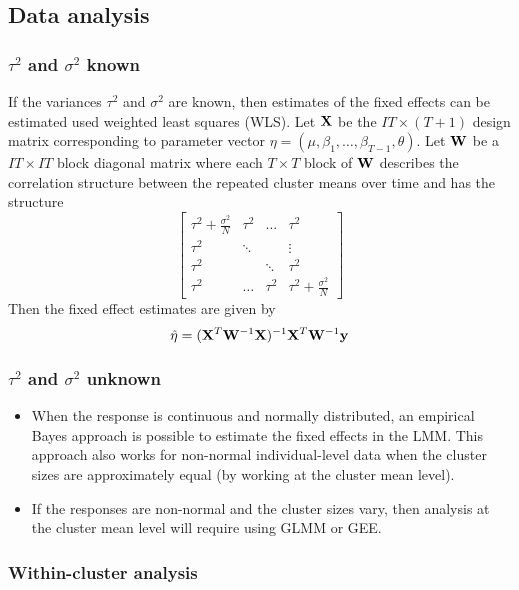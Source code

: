 \documentclass{article}
\newcommand{\bfW}{{\bf W}}
\newcommand{\bfX}{{\bf X}}
\newcommand{\bfy}{{\bf y}}
\begin{document}
\subsection{Data analysis}

\subsubsection{$\tau^2$ and $\sigma^2$ known}

If the variances $\tau^2$ and $\sigma^2$ are known, then estimates of the fixed effects can be estimated used weighted least squares (WLS). Let $\bfX$ be the $IT\times(T+1)$ design matrix corresponding to parameter vector $\eta=(\mu,\beta_1,\ldots,\beta_{T-1},\theta)$. Let $\bfW$ be a $IT\times IT$ block diagonal matrix where each $T\times T$ block of $\bfW$ describes the correlation structure between the repeated cluster means over time and has the structure
\[
\begin{bmatrix}
\tau^2 + \frac{\sigma^2}{N} & \tau^2 & \ldots & \tau^2 \\
\tau^2 & \ddots & & \vdots \\
\tau^2 & & \ddots & \tau^2 \\
\tau^2 & \ldots & \tau^2 & \tau^2 + \frac{\sigma^2}{N}
\end{bmatrix}
\]
Then the fixed effect estimates are given by
\[
\hat{\eta} = (\bfX^T\bfW^{-1}\bfX)^{-1}\bfX^T\bfW^{-1}\bfy
\]

\subsubsection{$\tau^2$ and $\sigma^2$ unknown}

\begin{itemize}

\item
When the response is continuous and normally distributed, an empirical Bayes approach is possible to estimate the fixed effects in the LMM. This approach also works for non-normal individual-level data when the cluster sizes are approximately equal (by working at the cluster mean level).

\item
If the responses are non-normal and the cluster sizes vary, then analysis at the cluster mean level will require using GLMM or GEE.

\end{itemize}

\subsubsection{Within-cluster analysis}
\end{document}
